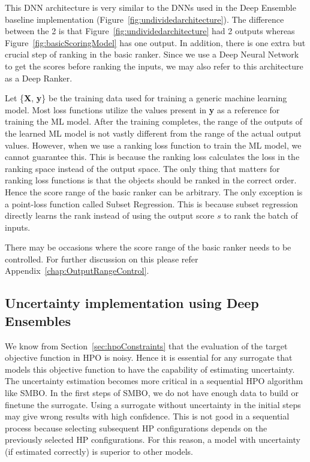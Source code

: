 \documentclass[12pt, twoside, ngerman]{report}
\begin{document}
This DNN architecture is very similar to the DNNs used in the Deep Ensemble baseline implementation (Figure~\ref{fig:undividedarchitecture}).
The difference between the 2 is that Figure~\ref{fig:undividedarchitecture} had 2 outputs whereas Figure~\ref{fig:basicScoringModel} has one output.
In addition, there is one extra but crucial step of ranking in the basic ranker.
Since we use a Deep Neural Network to get the scores before ranking the inputs,  we may also refer to this architecture as a Deep Ranker.

Let  \{\textbf{X}, \textbf{y}\} be the training data used for training a generic machine learning model.
Most loss functions utilize the values present in \textbf{y} as a reference for training the ML model.
After the training completes, the range of the outputs of the learned ML model is not vastly different from the range of the actual output values.
However, when we use a ranking loss function to train the ML model, we cannot guarantee this. This is because the ranking loss calculates the loss in the ranking space instead of the output space.
The only thing that matters for ranking loss functions is that the objects should be ranked in the correct order.
Hence the score range of the basic ranker can be arbitrary.
The only exception is a point-loss function called Subset Regression.
This is because subset regression directly learns the rank instead of using the output score $s$ to rank the batch of inputs.

There may be occasions where the score range of the basic ranker needs to be controlled.
For further discussion on this please refer Appendix~\ref{chap:OutputRangeControl}.


\subsection{Uncertainty implementation using Deep Ensembles}\label{sec:UncertaintyImplementation}

We know from Section~\ref{sec:hpoConstraints} that the evaluation of the target objective function in HPO is noisy.
Hence it is essential for any surrogate that models this objective function to have the capability of estimating uncertainty.
The uncertainty estimation becomes more critical in a sequential HPO algorithm like SMBO.
In the first steps of SMBO, we do not have enough data to build or finetune the surrogate.
Using a surrogate without uncertainty in the initial steps may give wrong results with high confidence.
This is not good in a sequential process because selecting subsequent HP configurations depends on the previously selected HP configurations.
For this reason, a model with uncertainty (if estimated correctly) is superior to other models.
\end{document}
